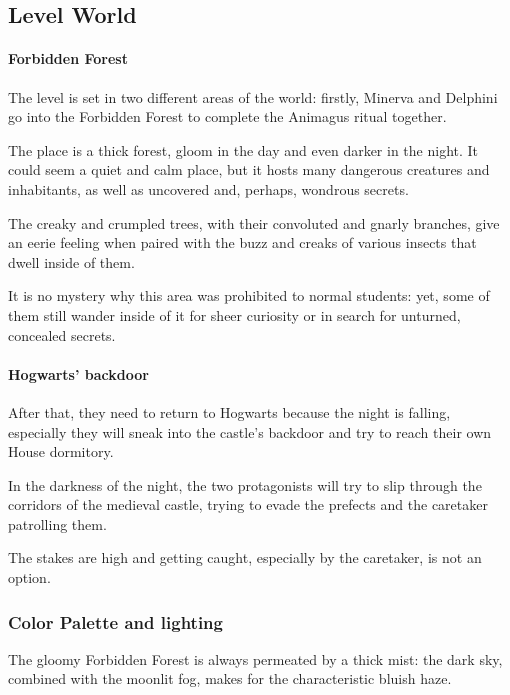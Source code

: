 \subsection{Level World}

\paragraph{Forbidden Forest}
The level is set in two different areas of the world: firstly, Minerva and Delphini go into the Forbidden Forest to complete the Animagus ritual together. 

The place is a thick forest, gloom in the day and even darker in the night. It could seem a quiet and calm place, but it hosts many dangerous creatures and inhabitants, as well as uncovered and, perhaps, wondrous secrets.


The creaky and crumpled trees, with their convoluted and gnarly branches, give an eerie feeling when paired with the buzz and creaks of various insects that dwell inside of them.

It is no mystery why this area was prohibited to normal students: yet, some of them still wander inside of it for sheer curiosity or in search for unturned, concealed secrets.

\clearpage

\paragraph{Hogwarts' backdoor}

After that, they need to return to Hogwarts because the night is falling, especially they will sneak into the castle's backdoor and try to reach their own House dormitory.


In the darkness of the night, the two protagonists will try to slip through the corridors of the medieval castle, trying to evade the prefects and the caretaker patrolling them.


The stakes are high and getting caught, especially by the caretaker, is not an option. 

\clearpage

\subsubsection{Color Palette and lighting}
The gloomy Forbidden Forest is always permeated by a thick mist: the dark sky, combined with the moonlit fog, makes for the characteristic bluish haze.

